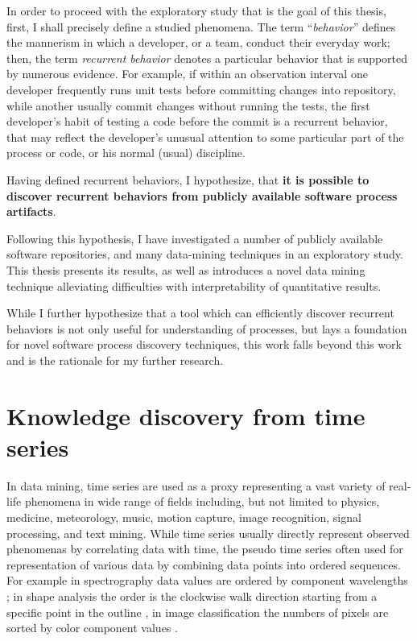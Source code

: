 In order to proceed with the exploratory study that is the goal of this thesis, first, 
I shall precisely define a studied phenomena. 
The term ``\textit{behavior}'' defines the mannerism in which a developer, or a team, conduct 
their everyday work; then, the term \textit{recurrent behavior} denotes a particular behavior 
that is supported by numerous evidence. 
For example, if within an observation interval one developer frequently runs unit tests before committing 
changes into repository, while another usually commit changes without running the tests, the first developer's
habit of testing a code before the commit is a recurrent behavior, that may reflect the developer's unusual 
attention to some particular part of the process or code, or his normal (usual) discipline.

Having defined recurrent behaviors, I hypothesize, that \textbf{it is possible to discover 
recurrent behaviors from publicly available software process artifacts}. 

Following this hypothesis, I have investigated a number of publicly available software repositories,
and many data-mining techniques in an exploratory study. This thesis presents its results,
as well as introduces a novel data mining technique alleviating difficulties with interpretability 
of quantitative results. 

While I further hypothesize that a tool which can efficiently discover recurrent behaviors is not only 
useful for understanding of processes, but lays a foundation for novel software process discovery techniques,
this work falls beyond this work and is the rationale for my further research.

%
%
\section{Knowledge discovery from time series}\label{section_knowledge_discovery}
In data mining, time series are used as a proxy representing a vast variety of real-life phenomena 
in wide range of fields including, but not limited to physics, medicine, meteorology, 
music, motion capture, image recognition, signal processing, and text mining. 
While time series usually directly represent observed phenomenas by correlating data with time, the pseudo 
time series often used for representation of various data by combining data points into ordered sequences. 
For example in spectrography data values are ordered by component wavelengths \cite{citeulike:12550833};
in shape analysis the order is the clockwise walk direction starting from a
specific point in the outline \cite{citeulike:12550835}, in image classification the numbers of pixels
are sorted by color component values \cite{citeulike:2900542}.

